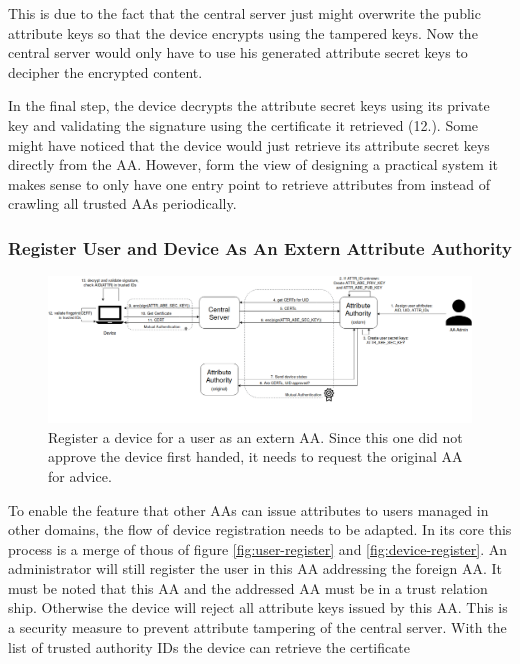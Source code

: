 This is due to the fact that the central server just might overwrite the public attribute keys so that the device encrypts using the tampered keys. Now the central server would only have to use his generated attribute secret keys to decipher the encrypted content. 

In the final step, the device decrypts the attribute secret keys using its private key and validating the signature using the certificate it retrieved (12.). Some might have noticed that the device would just retrieve its attribute secret keys directly from the AA. However, form the view of designing a practical system it makes sense to only have one entry point to retrieve attributes from instead of crawling all trusted AAs periodically. 


\subsubsection{Register User and Device As An Extern Attribute Authority}
\begin{figure}[!h]
\centering
    \includegraphics[width=\linewidth]{img/device_register2.png}
    \caption{Register a device for a user as an extern AA. Since this one did not approve the device first handed, it needs to request the original AA for advice.}
    \label{fig:device-register2}
\end{figure}
To enable the feature that other AAs can issue attributes to users managed in other domains, the flow of device registration needs to be adapted.  In its core this process is a merge of thous of figure \ref{fig:user-register} and \ref{fig:device-register}. An administrator will still register the user in this AA addressing the foreign AA. It must be noted that this AA and the addressed AA must be in a trust relation ship. Otherwise the device will reject all attribute keys issued by this AA. This is a security measure to prevent attribute tampering of the central server. With the list of trusted authority IDs the device can retrieve the certificate 

